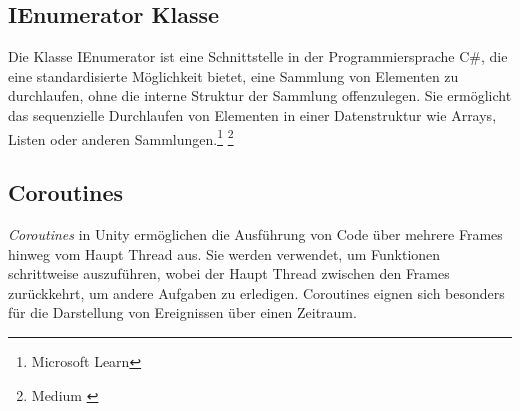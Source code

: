 \subsection{\label{sec:IEnumerator}IEnumerator Klasse}
Die Klasse IEnumerator ist eine Schnittstelle in der Programmiersprache C\#, die eine standardisierte Möglichkeit bietet, eine Sammlung von Elementen zu durchlaufen, ohne die interne Struktur der Sammlung offenzulegen. Sie ermöglicht das sequenzielle Durchlaufen von Elementen in einer Datenstruktur wie Arrays, Listen oder anderen Sammlungen.\protect\footnote{Microsoft Learn\cite{IEnumeratorMicrosoft}} \footnote{Medium \cite{IEnumeratorMedium}}

\subsection{\label{sec:Coroutines}Coroutines}
\textit{Coroutines} in Unity ermöglichen die Ausführung von Code über mehrere Frames hinweg vom Haupt Thread aus. Sie werden verwendet, um Funktionen schrittweise auszuführen, wobei der Haupt Thread zwischen den Frames zurückkehrt, um andere Aufgaben zu erledigen. Coroutines eignen sich besonders für die Darstellung von Ereignissen über einen Zeitraum.
\\
